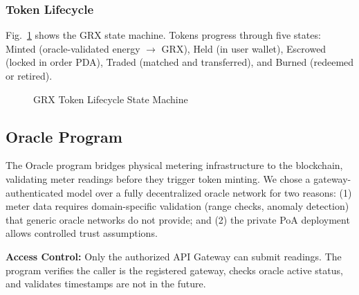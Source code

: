 \documentclass[conference]{IEEEtran}
\begin{document}
\subsubsection{Token Lifecycle}
Fig.~\ref{fig:token-lifecycle} shows the GRX state machine. Tokens progress through five states: Minted (oracle-validated energy $\rightarrow$ GRX), Held (in user wallet), Escrowed (locked in order PDA), Traded (matched and transferred), and Burned (redeemed or retired).

\begin{figure}[htbp]
\centering
{}%
\caption{GRX Token Lifecycle State Machine}
\label{fig:token-lifecycle}
\end{figure}

\subsection{Oracle Program}
\label{sec:oracle}

The Oracle program bridges physical metering infrastructure to the blockchain, validating meter readings before they trigger token minting. We chose a gateway-authenticated model over a fully decentralized oracle network for two reasons: (1) meter data requires domain-specific validation (range checks, anomaly detection) that generic oracle networks do not provide; and (2) the private PoA deployment allows controlled trust assumptions.

\textbf{Access Control:} Only the authorized API Gateway can submit readings. The program verifies the caller is the registered gateway, checks oracle active status, and validates timestamps are not in the future.
\end{document}
